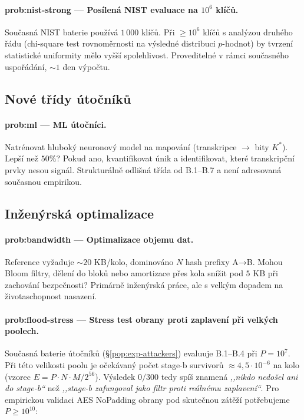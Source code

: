 \documentclass[11pt,a4paper]{article}
\begin{document}
\paragraph{prob:nist-strong --- Posílená NIST evaluace na $10^6$ klíčů.} Současná NIST baterie používá $1\,000$ klíčů. Při $\geq 10^6$ klíčů s analýzou druhého řádu (chi-square test rovnoměrnosti na výsledné distribuci $p$-hodnot) by tvrzení statistické uniformity mělo vyšší spolehlivost. Proveditelné v rámci současného uspořádání, $\sim 1$ den výpočtu.

\subsection{Nové třídy útočníků}

\paragraph{prob:ml --- ML útočníci.} Natrénovat hluboký neuronový model na mapování (transkripce $\to$ bity $K^*$). Lepší než $50\%$? Pokud ano, kvantifikovat únik a identifikovat, které transkripční prvky nesou signál. Strukturálně odlišná třída od B.1--B.7 a není adresovaná současnou empirikou.

\subsection{Inženýrská optimalizace}

\paragraph{prob:bandwidth --- Optimalizace objemu dat.} Reference vyžaduje $\sim 20$ KB/kolo, dominováno $N$ hash prefixy A→B. Mohou Bloom filtry, dělení do bloků nebo amortizace přes kola snížit pod $5$ KB při zachování bezpečnosti? Primárně inženýrská práce, ale s velkým dopadem na životaschopnost nasazení.

\paragraph{prob:flood-stress --- Stress test obrany proti zaplavení při velkých poolech.} Současná baterie útočníků (§\ref{pop:exp-attackers}) evaluuje B.1--B.4 při $P = 10^7$. Při této velikosti poolu je očekávaný počet stage-b survivorů $\approx 4{,}5 \cdot 10^{-6}$ na kolo (vzorec $E = P \cdot N \cdot M / 2^{56}$). Výsledek $0/300$ tedy spíš znamená \emph{,,nikdo nedošel ani do stage-b``} než \emph{,,stage-b zafungoval jako filtr proti reálnému zaplavení``}. Pro empirickou validaci AES NoPadding obrany pod skutečnou zátěží potřebujeme $P \geq 10^{10}$:
\end{document}
